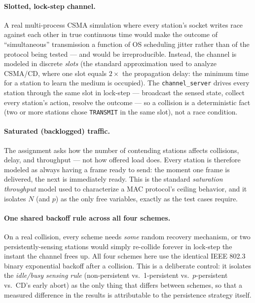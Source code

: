 \documentclass[11pt]{article}
\begin{document}
\paragraph{Slotted, lock-step channel.} A real multi-process CSMA simulation where every
station's socket writes race against each other in true continuous time would make the
outcome of ``simultaneous'' transmission a function of OS scheduling jitter rather than of
the protocol being tested --- and would be irreproducible. Instead, the channel is modeled
in discrete \emph{slots} (the standard approximation used to analyze CSMA/CD, where one slot
equals $2\times$ the propagation delay: the minimum time for a station to learn the medium
is occupied). The \texttt{channel\_server} drives every station through the same slot in
lock-step --- broadcast the sensed state, collect every station's action, resolve the
outcome --- so a collision is a deterministic fact (two or more stations chose
\texttt{TRANSMIT} in the same slot), not a race condition.

\paragraph{Saturated (backlogged) traffic.} The assignment asks how the number of
contending stations affects collisions, delay, and throughput --- not how offered load does.
Every station is therefore modeled as always having a frame ready to send: the moment one
frame is delivered, the next is immediately ready. This is the standard \emph{saturation
throughput} model used to characterize a MAC protocol's ceiling behavior, and it isolates
$N$ (and $p$) as the only free variables, exactly as the test cases require.

\paragraph{One shared backoff rule across all four schemes.} On a real collision, every
scheme needs \emph{some} random recovery mechanism, or two persistently-sensing stations
would simply re-collide forever in lock-step the instant the channel frees up. All four
schemes here use the identical IEEE 802.3 binary exponential backoff after a collision. This
is a deliberate control: it isolates the \emph{idle/busy sensing rule} (non-persistent vs.\
1-persistent vs.\ $p$-persistent vs.\ CD's early abort) as the only thing that differs
between schemes, so that a measured difference in the results is attributable to the
persistence strategy itself.
\end{document}

